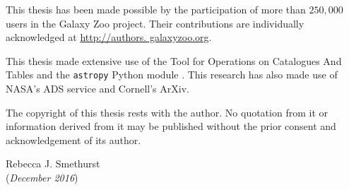 \documentclass[12pt,useAMS]{ociamthesis}  %
\begin{document}
\begin{originality}
This thesis has been made possible by the participation of more than $250,000$ users in the Galaxy Zoo project. Their contributions are individually acknowledged at \url{http://authors. galaxyzoo.org}.

This thesis made extensive use of the Tool for Operations on Catalogues And Tables \citep[TOPCAT;][]{taylor05} and the {\tt astropy} Python module \citep{astropy13}. This research has also made use of NASA's ADS service and Cornell's ArXiv.

The copyright of this thesis rests with the author. No quotation from it or information derived from it may be published without the prior consent and acknowledgement of its author. 

\begin{flushright}
Rebecca J. Smethurst
\\
(\emph{December 2016})
\end{flushright}


\end{originality}
\end{document}
